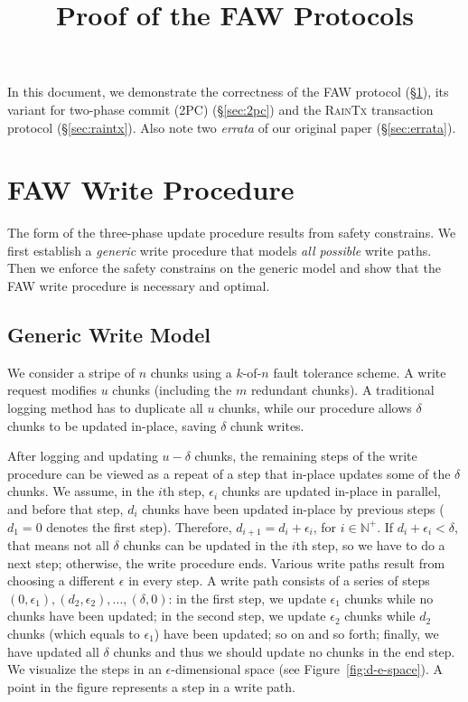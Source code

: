 \documentclass[letterpaper,10pt,twocolumn]{article}
\date{}
\def\protocol/{FAW}
\begin{document}
\title{Proof of the \protocol/ Protocols}

\maketitle

In this document, we demonstrate the correctness of the \protocol/ protocol (\S\ref{sec:faw}), its variant for two-phase commit (2PC) (\S\ref{sec:2pc}) and the \textsc{RainTx} transaction protocol (\S\ref{sec:raintx}).
Also note two \emph{errata} of our original paper (\S\ref{sec:errata}).

\section{\protocol/ Write Procedure}
\label{sec:faw}

The form of the three-phase update procedure results from safety constrains.
We first establish a \emph{generic} write procedure that models \emph{all possible} write paths.
Then we enforce the safety constrains on the generic model and show that the \protocol/ write procedure is necessary and optimal. 

\subsection{Generic Write Model}

We consider a stripe of $n$ chunks using a $k$-of-$n$ fault tolerance scheme.
A write request modifies $u$ chunks (including the $m$ redundant chunks).
A traditional logging method has to duplicate all $u$ chunks, while our procedure allows $\delta$ chunks to be updated in-place, saving $\delta$ chunk writes.

After logging and updating $u - \delta$ chunks, the remaining steps of the write procedure can be viewed as a repeat of a step that in-place updates some of the $\delta$ chunks.
We assume, in the $i$th step, $\epsilon_i$ chunks are updated in-place in parallel, and before that step, $d_i$ chunks have been updated in-place by previous steps ($d_1=0$ denotes the first step).
Therefore, $d_{i+1} = d_i + \epsilon_i$, for $i \in \mathbb{N}^{+}$. If $d_i + \epsilon_i < \delta$, that means not all $\delta$ chunks can be updated in the $i$th step, so we have to do a next step; otherwise, the write procedure ends.
Various write paths result from choosing a different $\epsilon$ in every step.
A write path consists of a series of steps $(0, \epsilon_1), (d_2, \epsilon_2), ..., (\delta, 0)$: in the first step, we update $\epsilon_1$ chunks while no chunks have been updated; in the second step, we update $\epsilon_2$ chunks while $d_2$ chunks (which equals to $\epsilon_1$) have been updated; so on and so forth; finally, we have updated all $\delta$ chunks and thus we should update no chunks in the end step.
We visualize the steps in an $\epsilon$-dimensional space (see Figure~\ref{fig:d-e-space}).
A point in the figure represents a step in a write path.
\end{document}
